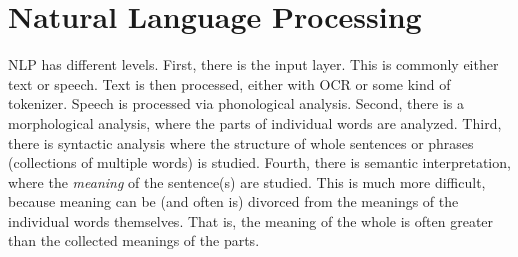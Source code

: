 \section{Natural Language Processing}\label{sec:nlp}

NLP has different levels.
First, there is the input layer.
This is commonly either text or speech.
Text is then processed, either with OCR or some kind of tokenizer.
Speech is processed via phonological analysis.
Second, there is a morphological analysis, where the parts of individual words are analyzed.
Third, there is syntactic analysis where the structure of whole sentences or phrases (collections of multiple words) is studied.
Fourth, there is semantic interpretation, where the \textit{meaning} of the sentence(s) are studied.
This is much more difficult, because meaning can be (and often is) divorced from the meanings of the individual words themselves.
That is, the meaning of the whole is often greater than the collected meanings of the parts.
